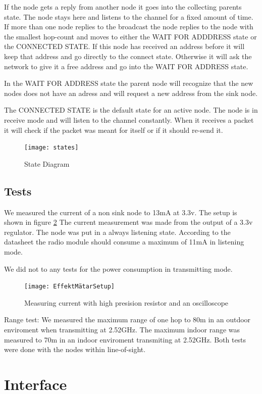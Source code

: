 \documentclass[a4paper,11pt]{article}
\begin{document}
If the node gets a reply from another node it goes into the collecting
parents state. The node stays here and listens to the channel for a
fixed amount of time. If more than one node replies to the broadcast
the node replies to the node with the smallest hop-count and moves to
either the WAIT FOR ADDDRESS state or the CONNECTED STATE. If this
node has received an address before it will keep that address and go
directly to the connect state. Otherwise it will ask the network to
give it a free address and go into the WAIT FOR ADDRESS state.

In the WAIT FOR ADDRESS state the parent node will recognize that the
new nodes does not have an adress and will request a new address from
the sink node. 

The CONNECTED STATE is the default state for an active node. The node
is in receive mode and will listen to the channel constantly. When
it receives a packet it will check if the packet was meant for
itself or if it should re-send it.


\begin{figure}[h!]
  \texttt{[image: states]}
  \caption{State Diagram}
  \label{fig:state}
\end{figure}

\subsection{Tests}
We measured the current of a non sink node to 13mA at 3.3v. The setup
is shown in figure \ref{fig:Effekt} The current measurement was made from
the output of a 3.3v regulator.  The node was put in a always
listening state. According to the datasheet the radio module should
consume a maximum of 11mA in listening mode.

We did not to any tests for the power consumption in transmitting
mode.

\begin{figure}[h!]
  \texttt{[image: EffektMätarSetup]}
  \caption{Measuring current with high presision resistor and an oscilloscope}
  \label{fig:Effekt}
\end{figure}

Range test:
We measured the maximum range of one hop to 80m in an outdoor 
enviroment when transmitting at 2.52GHz. 
The maximum indoor range was measured to 70m in an indoor
enviroment transmiting at 2.52GHz. Both tests were done with the nodes within line-of-sight.
 


\section{Interface}
\end{document}
